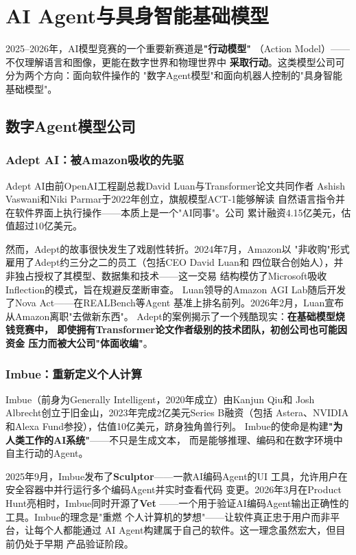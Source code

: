 \section{AI Agent与具身智能基础模型}
\label{sec:models-agent-embodied}

2025--2026年，AI模型竞赛的一个重要新赛道是\textbf{"行动模型"}
（Action Model）——不仅理解语言和图像，更能在数字世界和物理世界中
\textbf{采取行动}。这类模型公司可分为两个方向：面向软件操作的
"数字Agent模型"和面向机器人控制的"具身智能基础模型"。

\subsection{数字Agent模型公司}
\label{subsec:agent-models}

\subsubsection{Adept AI：被Amazon吸收的先驱}
Adept AI由前OpenAI工程副总裁David Luan与Transformer论文共同作者
Ashish Vaswani和Niki Parmar于2022年创立，旗舰模型ACT-1能够解读
自然语言指令并在软件界面上执行操作——本质上是一个"AI同事"。公司
累计融资4.15亿美元，估值超过10亿美元。

然而，Adept的故事很快发生了戏剧性转折。2024年7月，Amazon以
"非收购"形式雇用了Adept约三分之二的员工（包括CEO David Luan和
四位联合创始人），并非独占授权了其模型、数据集和技术——这一交易
结构模仿了Microsoft吸收Inflection的模式，旨在规避反垄断审查。
Luan领导的Amazon AGI Lab随后开发了Nova Act——在REALBench等Agent
基准上排名前列。2026年2月，Luan宣布从Amazon离职"去做新东西"。
Adept的案例揭示了一个残酷现实：\textbf{在基础模型烧钱竞赛中，
即使拥有Transformer论文作者级别的技术团队，初创公司也可能因资金
压力而被大公司"体面收编"}。

\subsubsection{Imbue：重新定义个人计算}
Imbue（前身为Generally Intelligent，2020年成立）由Kanjun Qiu和
Josh Albrecht创立于旧金山，2023年完成2亿美元Series B融资（包括
Astera、NVIDIA和Alexa Fund参投），估值10亿美元，跻身独角兽行列。
Imbue的使命是构建\textbf{"为人类工作的AI系统"}——不只是生成文本，
而是能够推理、编码和在数字环境中自主行动的Agent。

2025年9月，Imbue发布了\textbf{Sculptor}——一款AI编码Agent的UI
工具，允许用户在安全容器中并行运行多个编码Agent并实时查看代码
变更。2026年3月在Product Hunt亮相时，Imbue同时开源了\textbf{Vet}
——一个用于验证AI编码Agent输出正确性的工具。Imbue的理念是"重燃
个人计算机的梦想"——让软件真正忠于用户而非平台，让每个人都能通过
AI Agent构建属于自己的软件。这一理念虽然宏大，但目前仍处于早期
产品验证阶段。

